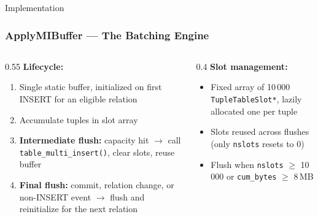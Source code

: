 \documentclass{beamer}
\begin{document}
\begin{frame}
\vspace*{\fill}\begin{center}
\huge{Implementation}
\end{center}\vspace*{\fill}
\end{frame}

\begin{frame}[fragile]\frametitle{ApplyMIBuffer --- The Batching Engine}
\begin{columns}[T]
\begin{column}{0.55\textwidth}
\textbf{Lifecycle:}
\begin{enumerate}
  \item Single static buffer, initialized on first
        INSERT for an eligible relation
  \item Accumulate tuples in slot array
  \item \textbf{Intermediate flush:} capacity hit $\to$ call
        \texttt{table\_multi\_insert()}, clear slots, reuse buffer
  \item \textbf{Final flush:} commit, relation change,
        or non-INSERT event $\to$ flush and reinitialize
        for the next relation
\end{enumerate}
\end{column}
\begin{column}{0.4\textwidth}
\textbf{Slot management:}
\begin{itemize}
  \item Fixed array of 10\,000 \texttt{TupleTableSlot*},
        lazily allocated one per tuple
  \item Slots reused across flushes (only \texttt{nslots} resets to 0)
  \item Flush when \texttt{nslots} $\geq$ 10\,000
        or \texttt{cum\_bytes} $\geq$ 8\,MB
\end{itemize}
\end{column}
\end{columns}
\end{frame}
\end{document}
